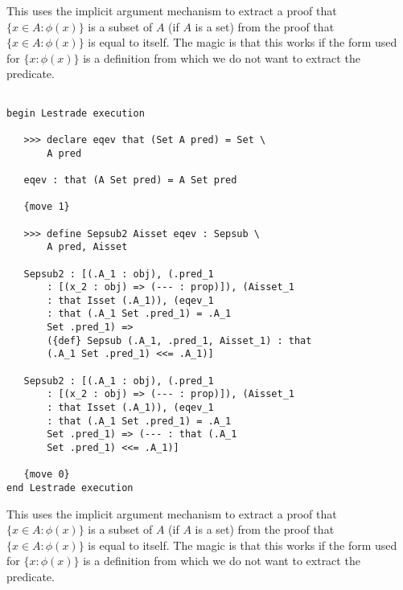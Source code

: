 \documentclass[12pt]{article}
\begin{document}
This uses the implicit argument mechanism to extract a proof that $\{x \in A:\phi(x)\}$ is a subset of $A$ (if $A$ is a set) from the proof that $\{x \in A:\phi(x)\}$ is equal to itself.
The magic is that this works if the form used for $\{x : \phi(x)\}$ is a definition from which we do not want to extract the predicate.

\begin{verbatim}

begin Lestrade execution

   >>> declare eqev that (Set A pred) = Set \
       A pred

   eqev : that (A Set pred) = A Set pred

   {move 1}

   >>> define Sepsub2 Aisset eqev : Sepsub \
       A pred, Aisset

   Sepsub2 : [(.A_1 : obj), (.pred_1 
       : [(x_2 : obj) => (--- : prop)]), (Aisset_1 
       : that Isset (.A_1)), (eqev_1 
       : that (.A_1 Set .pred_1) = .A_1 
       Set .pred_1) => 
       ({def} Sepsub (.A_1, .pred_1, Aisset_1) : that 
       (.A_1 Set .pred_1) <<= .A_1)]

   Sepsub2 : [(.A_1 : obj), (.pred_1 
       : [(x_2 : obj) => (--- : prop)]), (Aisset_1 
       : that Isset (.A_1)), (eqev_1 
       : that (.A_1 Set .pred_1) = .A_1 
       Set .pred_1) => (--- : that (.A_1 
       Set .pred_1) <<= .A_1)]

   {move 0}
end Lestrade execution
\end{verbatim}

This uses the implicit argument mechanism to extract a proof that $\{x \in A:\phi(x)\}$ is a subset of $A$ (if $A$ is a set) from the proof that $\{x \in A:\phi(x)\}$ is equal to itself.
The magic is that this works if the form used for $\{x : \phi(x)\}$ is a definition from which we do not want to extract the predicate.
\end{document}
